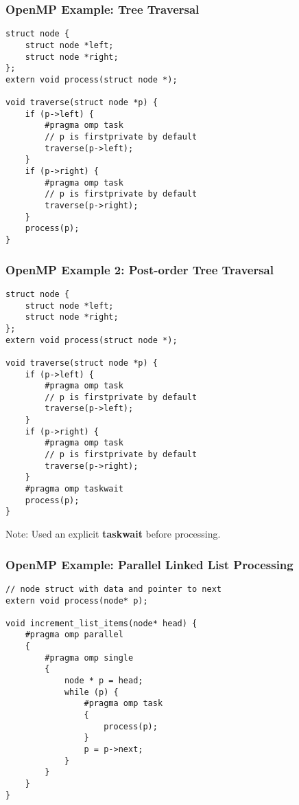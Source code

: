 \begin{frame}[fragile]
  \frametitle{OpenMP Example: Tree Traversal}

  
  \begin{lstlisting}
struct node {
    struct node *left;
    struct node *right;
};
extern void process(struct node *);

void traverse(struct node *p) {
    if (p->left) {
        #pragma omp task
        // p is firstprivate by default
        traverse(p->left);
    }
    if (p->right) {
        #pragma omp task
        // p is firstprivate by default
        traverse(p->right);
    }
    process(p);
}    
  \end{lstlisting}
  
\end{frame}

\begin{frame}[fragile]
  \frametitle{OpenMP Example 2: Post-order Tree Traversal}

  
  \begin{lstlisting}
struct node {
    struct node *left;
    struct node *right;
};
extern void process(struct node *);

void traverse(struct node *p) {
    if (p->left) {
        #pragma omp task
        // p is firstprivate by default
        traverse(p->left);
    }
    if (p->right) {
        #pragma omp task
        // p is firstprivate by default
        traverse(p->right);
    }
    #pragma omp taskwait
    process(p);
}    
  \end{lstlisting}
  
  Note: Used an explicit {\bf taskwait} before processing.
  
\end{frame}


\begin{frame}[fragile]
  \frametitle{OpenMP Example: Parallel Linked List Processing}

  
  \begin{lstlisting}
// node struct with data and pointer to next
extern void process(node* p);

void increment_list_items(node* head) {
    #pragma omp parallel
    {
        #pragma omp single
        {
            node * p = head;
            while (p) {
                #pragma omp task
                {
                    process(p);
                }
                p = p->next;
            }
        }
    }
}
  \end{lstlisting}
  
\end{frame}


